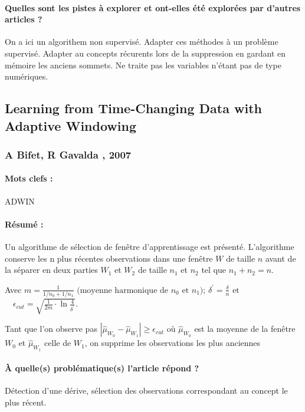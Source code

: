\documentclass[11pt,a4paper]{report}
\begin{document}
\paragraph{Quelles sont les pistes à explorer et ont-elles  été explorées par d'autres articles ? } On a ici un algorithem non supervisé. Adapter ces méthodes à un problème supervisé. Adapter au concepts récurents lors de la suppression en gardant en mémoire les anciens sommets. Ne traite pas les variables n'étant pas de type numériques.



\subsection{Learning from Time-Changing Data with Adaptive Windowing}
\subsubsection{A Bifet, R Gavalda , 2007}

\paragraph{Mots clefs :} ADWIN

\paragraph{Résumé :} Un algorithme de sélection de fenêtre d’apprentissage est présenté. L’algorithme conserve les n plus récentes observations dans une fenêtre $W$ de taille $n$ avant de la séparer en deux parties $W_1$ et $W_2$ de taille $n_1$ et $n_2$ tel que $n_1+n_2=n$. 

Avec $m=\frac{1}{1 / n_{0}+1 / n_{1}} \text { (moyenne harmonique de } n_{0} \text { et } n_{1} )  $; $\delta^{\prime}=\frac{\delta}{n} \text{ et } $ $ \quad \epsilon_{c u t}=\sqrt{\frac{1}{2 m} \cdot \ln \frac{4}{\delta^{\prime}}}$. 

Tant que l'on observe pas $\left|\hat{\mu}_{W_{0}}-\hat{\mu}_{W_{1}}\right| \geq \epsilon_{c u t}$ où $\hat{\mu}_{W_{0}}$ est la moyenne de la fenêtre $W_0$ et $\hat{\mu}_{W_{1}}$ celle de $W_1$, on supprime les observations les plus anciennes

\paragraph{À quelle(s) problématique(s) l'article répond ?} Détection d'une dérive, sélection des observations correspondant au concept le plus récent.
\end{document}
